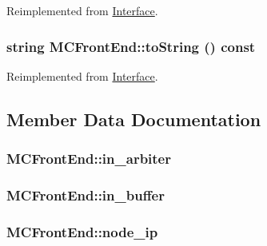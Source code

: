 Reimplemented from \hyperlink{classInterface_137cdb3bca46eb2ae0bbf017d1efb66e}{Interface}.\hypertarget{classMCFrontEnd_9dda980a7ae732e6cb6da7121bc4f539}{
\subsubsection[{toString}]{\setlength{\rightskip}{0pt plus 5cm}string MCFrontEnd::toString () const}}
\label{classMCFrontEnd_9dda980a7ae732e6cb6da7121bc4f539}




Reimplemented from \hyperlink{classInterface_137cdb3bca46eb2ae0bbf017d1efb66e}{Interface}.

\subsection{Member Data Documentation}
\hypertarget{classMCFrontEnd_366abfbae09ca49371a4c5ea5548820d}{
\subsubsection[{in\_\-arbiter}]{ {\bf MCFrontEnd::in\_\-arbiter}}}
\label{classMCFrontEnd_366abfbae09ca49371a4c5ea5548820d}


\hypertarget{classMCFrontEnd_7f312b013c788e1d28ac936d8808795e}{
\subsubsection[{in\_\-buffer}]{ {\bf MCFrontEnd::in\_\-buffer}}}
\label{classMCFrontEnd_7f312b013c788e1d28ac936d8808795e}


\hypertarget{classMCFrontEnd_99eed4a2a554a84018c06637e863b525}{
\subsubsection[{node\_\-ip}]{ {\bf MCFrontEnd::node\_\-ip}}}
\label{classMCFrontEnd_99eed4a2a554a84018c06637e863b525}




